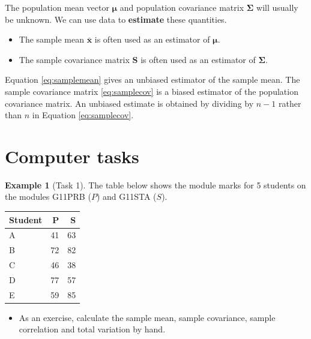\documentclass[]{book}
\providecommand{\tightlist}{%
  \setlength{\itemsep}{0pt}\setlength{\parskip}{0pt}}
\theoremstyle{definition}
\theoremstyle{definition}
\newtheorem{example}{Example}[chapter]
\theoremstyle{definition}
\theoremstyle{remark}
\begin{document}
The population mean vector \(\boldsymbol \mu\) and population covariance matrix \(\boldsymbol \Sigma\) will usually be unknown. We can use data to \textbf{estimate} these quantities.

\begin{itemize}
\tightlist
\item
  The sample mean \(\bar{\boldsymbol x}\) is often used as an estimator of \(\boldsymbol \mu\).
\item
  The sample covariance matrix \(\boldsymbol S\) is often used as an estimator of \(\boldsymbol \Sigma\).
\end{itemize}

Equation \eqref{eq:samplemean} gives an unbiased estimator of the sample mean. The sample covariance matrix \eqref{eq:samplecov} is a biased estimator of the population covariance matrix. An unbiased estimate is obtained by dividing by \(n-1\) rather than \(n\) in Equation \eqref{eq:samplecov}.

\hypertarget{computer-tasks}{%
\section{Computer tasks}\label{computer-tasks}}

\begin{example}[Task 1]
\protect\hypertarget{exm:unnamed-chunk-9}{}{\label{exm:unnamed-chunk-9} {} }The table below shows the module marks for 5 students on the modules G11PRB (\(P\)) and G11STA (\(S\)).
\end{example}

\begin{table}[H]
\centering
\begin{tabular}{lrr}
\toprule
Student & P & S\\
\midrule
A & 41 & 63\\
B & 72 & 82\\
C & 46 & 38\\
D & 77 & 57\\
E & 59 & 85\\
\bottomrule
\end{tabular}
\end{table}

\begin{itemize}
\tightlist
\item
  As an exercise, calculate the sample mean, sample covariance, sample correlation and total variation by hand.
\end{itemize}
\end{document}
